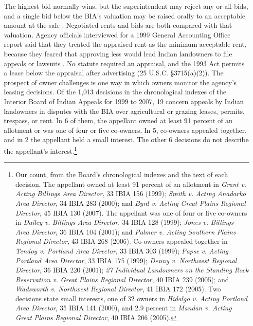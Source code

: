 \documentclass[12pt]{article}
\begin{document}
The highest bid normally wins, but the superintendent may reject any or all bids, and a single bid below the BIA's valuation may be raised orally to an acceptable amount at the sale \citep[p.~16 and Attachment~14A]{BIA2006Ch2}. Negotiated rents and bids are both compared with that valuation. Agency officials interviewed for a 1999 General Accounting Office report said that they treated the appraised rent as the minimum acceptable rent, because they feared that approving less would lead Indian landowners to file appeals or lawsuits \citep[p.~13]{GAO1999}. No statute required an appraisal, and the 1993 Act permits a lease below the appraisal after advertising (25 U.S.C. \S 3715(a)(2)). The prospect of owner challenges is one way in which owners monitor the agency's leasing decisions. Of the 1,013 decisions in the chronological indexes of the Interior Board of Indian Appeals for 1999 to 2007, 19 concern appeals by Indian landowners in disputes with the BIA over agricultural or grazing leases, permits, trespass, or rent. In 6 of them, the appellant owned at least 91 percent of an allotment or was one of four or five co-owners. In 5, co-owners appealed together, and in 2 the appellant held a small interest. The other 6 decisions do not describe the appellant's interest.\footnote{Our count, from the Board's chronological indexes and the text of each decision. The appellant owned at least 91 percent of an allotment in \textit{Grant v. Acting Billings Area Director}, 33 IBIA 156 (1999); \textit{Smith v. Acting Anadarko Area Director}, 34 IBIA 283 (2000); and \textit{Byrd v. Acting Great Plains Regional Director}, 45 IBIA 130 (2007). The appellant was one of four or five co-owners in \textit{Dailey v. Billings Area Director}, 34 IBIA 128 (1999); \textit{Jones v. Billings Area Director}, 36 IBIA 104 (2001); and \textit{Palmer v. Acting Southern Plains Regional Director}, 43 IBIA 268 (2006). Co-owners appealed together in \textit{Tendoy v. Portland Area Director}, 33 IBIA 303 (1999); \textit{Papse v. Acting Portland Area Director}, 33 IBIA 175 (1999); \textit{Denny v. Northwest Regional Director}, 36 IBIA 220 (2001); \textit{27 Individual Landowners on the Standing Rock Reservation v. Great Plains Regional Director}, 40 IBIA 239 (2005); and \textit{Wadsworth v. Northwest Regional Director}, 41 IBIA 172 (2005). Two decisions state small interests, one of 32 owners in \textit{Hidalgo v. Acting Portland Area Director}, 35 IBIA 141 (2000), and 2.9 percent in \textit{Mandan v. Acting Great Plains Regional Director}, 40 IBIA 206 (2005).}
\end{document}
